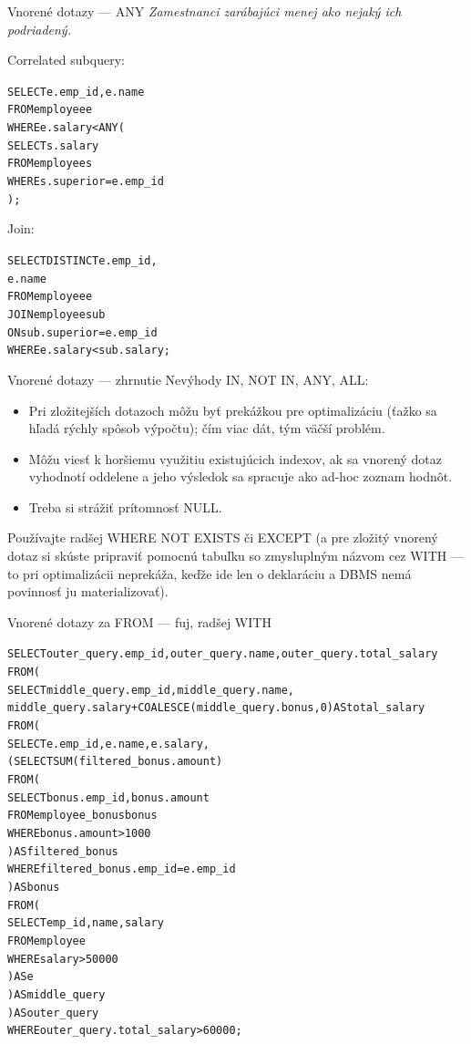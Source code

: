 \documentclass[12pt]{beamer}
\def\blue#1{\textcolor{Cerulean}{#1}}
\begin{document}
\begin{frame}[fragile]{Vnorené dotazy --- ANY}
\footnotesize
\emph{Zamestnanci zarábajúci menej ako nejaký ich podriadený.}\\[7mm]
\begin{minipage}{.4\pdfpagewidth}
Correlated subquery:
\footnotesize
\begin{alltt}
SELECT e.emp_id, e.name
FROM employee e
WHERE e.salary < \blue{ANY} (
  SELECT s.salary
  FROM employee s
  WHERE s.superior = e.emp_id
);
\end{alltt}
\end{minipage}
\hfill\vline\hfill
\begin{minipage}{.4\pdfpagewidth}
Join:
\footnotesize
\begin{alltt}
SELECT DISTINCT e.emp_id,
                e.name
FROM employee e
  JOIN employee sub
    ON sub.superior = e.emp_id
WHERE e.salary < sub.salary;


\end{alltt}
\end{minipage}
\end{frame}

\begin{frame}{Vnorené dotazy --- zhrnutie}
Nevýhody IN, NOT IN, ANY, ALL:
\begin{itemize}
\item Pri zložitejších dotazoch môžu byť prekážkou pre optimalizáciu (ťažko sa hľadá rýchly spôsob výpočtu); čím viac dát, tým väčší problém.
\item Môžu viesť k horšiemu využitiu existujúcich indexov, ak sa vnorený dotaz vyhodnotí oddelene a jeho výsledok sa spracuje ako ad-hoc zoznam hodnôt.
\item Treba si strážiť prítomnosť NULL.
\end{itemize}
\bigskip

Používajte radšej WHERE NOT EXISTS či EXCEPT
(a pre zložitý vnorený dotaz si skúste pripraviť pomocnú tabuľku so zmysluplným názvom cez WITH ---
to pri optimalizácii neprekáža, keďže ide len o deklaráciu a DBMS nemá povinnosť ju materializovať).
\end{frame}

\begin{frame}[fragile]{Vnorené dotazy za FROM --- fuj, radšej WITH}
\scriptsize
\begin{alltt}
SELECT outer_query.emp_id, outer_query.name, outer_query.total_salary
FROM (
  SELECT middle_query.emp_id, middle_query.name,
    middle_query.salary + COALESCE(middle_query.bonus, 0) AS total_salary
  FROM (
    SELECT e.emp_id, e.name, e.salary,
      (SELECT SUM(filtered_bonus.amount)
       FROM (
         SELECT bonus.emp_id, bonus.amount
         FROM employee_bonus bonus
         WHERE bonus.amount > 1000
       ) AS filtered_bonus
       WHERE filtered_bonus.emp_id = e.emp_id
      ) AS bonus
    FROM (
      SELECT emp_id, name, salary
      FROM employee
      WHERE salary > 50000
    ) AS e
  ) AS middle_query
) AS outer_query
WHERE outer_query.total_salary > 60000;
\end{alltt}
\end{frame}
\end{document}
